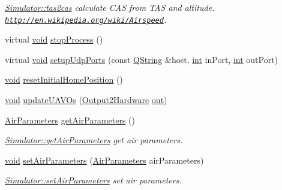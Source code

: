 \begin{DoxyCompactItemize}
\begin{DoxyCompactList}\small\item\em \hyperlink{group___h_i_t_l_plugin_gaf6d17454fad82383037d44ed3cb93a12}{Simulator\-::tas2cas} calculate C\-A\-S from T\-A\-S and altitude. \href{http://en.wikipedia.org/wiki/Airspeed}{\tt http\-://en.\-wikipedia.\-org/wiki/\-Airspeed}. \end{DoxyCompactList}\item 
virtual \hyperlink{group___u_a_v_objects_plugin_ga444cf2ff3f0ecbe028adce838d373f5c}{void} \hyperlink{group___h_i_t_l_plugin_ga12b351ec9ec8410a28d4f0f3d04ef9b6}{stop\-Process} ()
\item 
virtual \hyperlink{group___u_a_v_objects_plugin_ga444cf2ff3f0ecbe028adce838d373f5c}{void} \hyperlink{group___h_i_t_l_plugin_ga106e46211d3a00bd4a7b3b3918b23f63}{setup\-Udp\-Ports} (const \hyperlink{group___u_a_v_objects_plugin_gab9d252f49c333c94a72f97ce3105a32d}{Q\-String} \&host, \hyperlink{ioapi_8h_a787fa3cf048117ba7123753c1e74fcd6}{int} in\-Port, \hyperlink{ioapi_8h_a787fa3cf048117ba7123753c1e74fcd6}{int} out\-Port)
\item 
\hyperlink{group___u_a_v_objects_plugin_ga444cf2ff3f0ecbe028adce838d373f5c}{void} \hyperlink{group___h_i_t_l_plugin_ga23bcac84c193a077fca82e61e250b99f}{reset\-Initial\-Home\-Position} ()
\item 
\hyperlink{group___u_a_v_objects_plugin_ga444cf2ff3f0ecbe028adce838d373f5c}{void} \hyperlink{group___h_i_t_l_plugin_gad1625bf27fadfc6a51218ad76d9926a6}{update\-U\-A\-V\-Os} (\hyperlink{struct_output2_hardware}{Output2\-Hardware} \hyperlink{uavobjecttemplate_8m_a2a89187d8e8e8fba509ef9ab5f815d88}{out})
\item 
\hyperlink{struct_air_parameters}{Air\-Parameters} \hyperlink{group___h_i_t_l_plugin_ga68df0005072e39f3a7208aa63944f4dd}{get\-Air\-Parameters} ()
\begin{DoxyCompactList}\small\item\em \hyperlink{group___h_i_t_l_plugin_ga68df0005072e39f3a7208aa63944f4dd}{Simulator\-::get\-Air\-Parameters} get air parameters. \end{DoxyCompactList}\item 
\hyperlink{group___u_a_v_objects_plugin_ga444cf2ff3f0ecbe028adce838d373f5c}{void} \hyperlink{group___h_i_t_l_plugin_ga2425318c670bb0ddcba4dcf35f891bee}{set\-Air\-Parameters} (\hyperlink{struct_air_parameters}{Air\-Parameters} air\-Parameters)
\begin{DoxyCompactList}\small\item\em \hyperlink{group___h_i_t_l_plugin_ga2425318c670bb0ddcba4dcf35f891bee}{Simulator\-::set\-Air\-Parameters} set air parameters. \end{DoxyCompactList}\end{DoxyCompactItemize}
